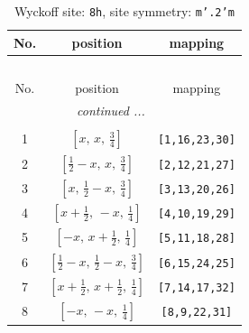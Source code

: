 \documentclass[fleqn,8pt]{jsarticle}
\begin{document}
\begin{longtable}{ccc}
\caption{Wyckoff site: {\tt 8h}, site symmetry: {\tt m'.2'm}}
 \\
 \hline \hline
No. & position & mapping \\ \hline \endfirsthead

\multicolumn{2}{l}{\tablename\ \thetable{}} \\
 \hline \hline
No. & position & mapping \\ \hline \endhead

 \hline \hline
\multicolumn{2}{r}{\footnotesize\it continued ...} \\ \endfoot

 \hline \hline
\multicolumn{2}{r}{} \\ \endlastfoot

1 & $\left[ x,\, x,\, \frac{3}{4} \right]$ & {\tt [1,16,23,30]} \\ \hline
2 & $\left[ \frac{1}{2} - x,\, x,\, \frac{3}{4} \right]$ & {\tt [2,12,21,27]} \\ \hline
3 & $\left[ x,\, \frac{1}{2} - x,\, \frac{3}{4} \right]$ & {\tt [3,13,20,26]} \\ \hline
4 & $\left[ x + \frac{1}{2},\, - x,\, \frac{1}{4} \right]$ & {\tt [4,10,19,29]} \\ \hline
5 & $\left[ - x,\, x + \frac{1}{2},\, \frac{1}{4} \right]$ & {\tt [5,11,18,28]} \\ \hline
6 & $\left[ \frac{1}{2} - x,\, \frac{1}{2} - x,\, \frac{3}{4} \right]$ & {\tt [6,15,24,25]} \\ \hline
7 & $\left[ x + \frac{1}{2},\, x + \frac{1}{2},\, \frac{1}{4} \right]$ & {\tt [7,14,17,32]} \\ \hline
8 & $\left[ - x,\, - x,\, \frac{1}{4} \right]$ & {\tt [8,9,22,31]} \\
\end{longtable}
\renewcommand{\arraystretch}{1.2}
\end{document}
